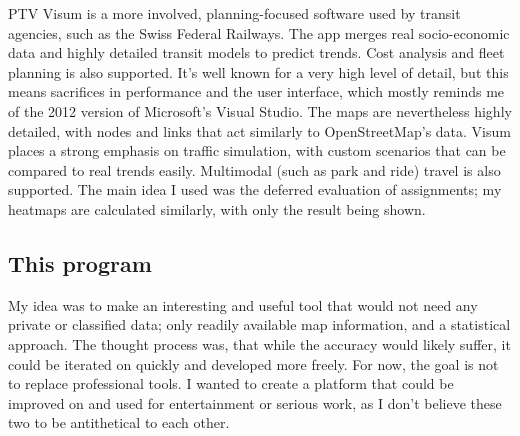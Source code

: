 PTV Visum is a more involved, planning-focused software used by transit agencies, such as the Swiss Federal Railways. The app merges real socio-economic data and highly detailed transit models to predict trends. Cost analysis and fleet planning is also supported. It's well known for a very high level of detail, but this means sacrifices in performance and the user interface, which mostly reminds me of the 2012 version of Microsoft's Visual Studio. The maps are nevertheless highly detailed, with nodes and links that act similarly to OpenStreetMap's data. Visum places a strong emphasis on traffic simulation, with custom scenarios that can be compared to real trends easily. Multimodal (such as park and ride) travel is also supported. The main idea I used was the deferred evaluation of assignments; my heatmaps are calculated similarly, with only the result being shown.

\subsection{This program}

My idea was to make an interesting and useful tool that would not need any private or classified data; only readily available map information, and a statistical approach. The thought process was, that while the accuracy would likely suffer, it could be iterated on quickly and developed more freely. For now, the goal is not to replace professional tools. I wanted to create a platform that could be improved on and used for entertainment or serious work, as I don't believe these two to be antithetical to each other. %